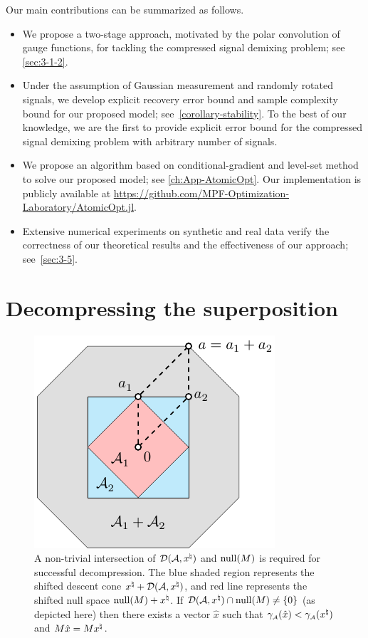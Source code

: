 Our main contributions can be summarized as follows.
\begin{itemize}
  \item We propose a two-stage approach, motivated by the polar convolution of gauge functions, for tackling the compressed signal demixing problem; see \autoref{sec:3-1-2}.
  \item Under the assumption of Gaussian measurement and randomly rotated signals, we develop explicit recovery error bound and sample complexity bound for our proposed model; see~\autoref{corollary-stability}. To the best of our knowledge, we are the first to provide explicit error bound for the compressed signal demixing problem with arbitrary number of signals. 
  \item We propose an algorithm based on conditional-gradient and level-set method to solve our proposed model; see \autoref{ch:App-AtomicOpt}. Our implementation is publicly available at \url{https://github.com/MPF-Optimization-Laboratory/AtomicOpt.jl}. 
  \item Extensive numerical experiments on synthetic and real data verify the correctness of our theoretical results and the effectiveness of our approach; see~\autoref{sec:3-5}.  
\end{itemize}


\section{Decompressing the superposition}\label{sec:3-2} 

\begin{figure}[t]
    \centering
   \includegraphics[page=7]{./figures/illustrations2} 
  \caption{A non-trivial intersection of $\mathcal{D}(\mathcal{A}, x^{\natural})$ and $\operatorname{null}(M)$ is required for successful decompression. The blue shaded region represents the shifted descent cone $x^{\natural} + \mathcal{D}(\mathcal{A}, x^{\natural})$, and red line represents the shifted null space $\operatorname{null}(M) + x^{\natural}$. If $\mathcal{D}(\mathcal{A}, x^{\natural}) \cap \operatorname{null}(M) \neq \{0\}$ (as depicted here) then there exists a vector $\hat x$ such that  $\gamma_{\scriptscriptstyle\mathcal{A}}(\hat x) < \gamma_{\scriptscriptstyle\mathcal{A}}(x^{\natural})$ and $M\hat x = Mx^{\natural}$.\label{fig:descent-cone}}
\end{figure}

